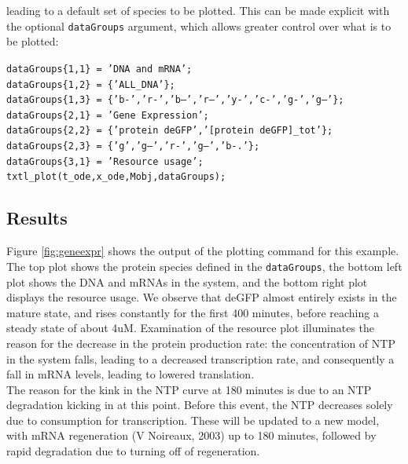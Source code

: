 \documentclass[english]{report}
\begin{document}
\noindent leading to a default set of species to be plotted. This can be made explicit with the optional \texttt{dataGroups} argument, which allows greater control over what is to be plotted: \\
				 \begin{flushleft}
						 \texttt{\noindent dataGroups\{1,1\} = 'DNA and mRNA'; \\
						dataGroups\{1,2\} = \{'ALL\_DNA'\};\\ 
						dataGroups\{1,3\} = \{'b-','r-','b--','r--','y-','c-','g-','g--'\};\\}
						\vspace*{1\baselineskip}
						\texttt{\noindent dataGroups\{2,1\} = 'Gene Expression';\\
						dataGroups\{2,2\} = \{'protein deGFP\textasteriskcentered','[protein deGFP]\_tot'\};\\
						dataGroups\{2,3\} = \{'g','g--','r-','g--','b-.'\};\\}
						\vspace*{1\baselineskip}
						\texttt{\noindent dataGroups\{3,1\} = 'Resource usage';\\}
						\vspace*{1\baselineskip}
						 \texttt{\noindent txtl\_plot(t\_ode,x\_ode,Mobj,dataGroups); \\}
					
				\end{flushleft}
						
		\subsection{Results}
		
		Figure \ref{fig:geneexpr} shows the output of the plotting command for this example. The top plot shows the protein species defined in the \texttt{dataGroups}, the bottom left plot shows the DNA and mRNAs in the system, and the bottom right plot displays the resource usage. We observe that deGFP almost entirely exists in the mature state, and rises constantly for the first 400 minutes, before reaching a steady state of about 4uM. Examination of the resource plot illuminates the reason for the decrease in the protein production rate: the concentration of NTP in the system falls, leading to a decreased transcription rate, and consequently a fall in mRNA levels, leading to lowered translation. \\
		The reason for the kink in the NTP curve at 180 minutes is due to an NTP degradation kicking in at this point. Before this event, the NTP decreases solely due to consumption for transcription. These will be updated to a new model, with mRNA regeneration (V Noireaux, 2003) up to 180 minutes, followed by rapid degradation due to turning off of regeneration. \\
	
\end{document}

